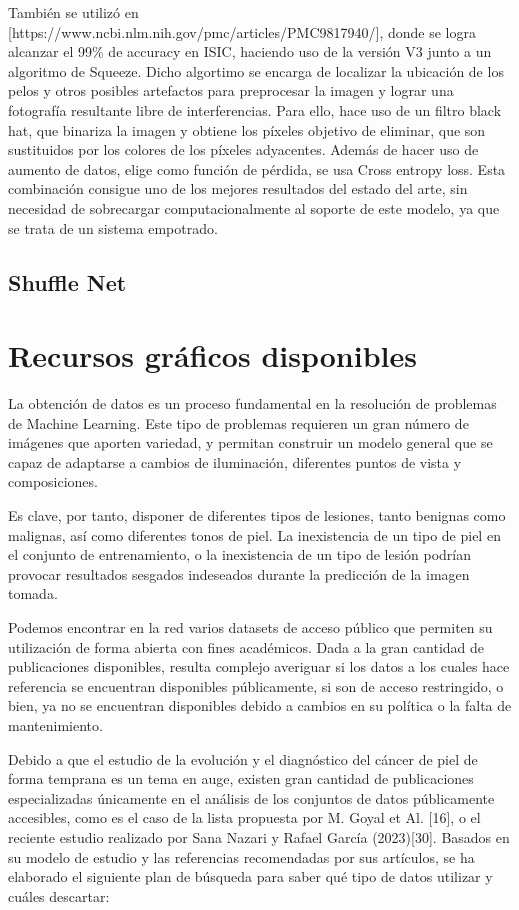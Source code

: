 También se utilizó en [https://www.ncbi.nlm.nih.gov/pmc/articles/PMC9817940/], donde se logra alcanzar el 99\% de accuracy en ISIC, haciendo uso de la versión V3 junto a un algoritmo de Squeeze. Dicho algortimo se encarga de localizar la ubicación de los pelos y otros posibles artefactos para preprocesar la imagen y lograr una fotografía resultante libre de interferencias. Para ello, hace uso de un filtro black hat, que binariza la imagen y obtiene los píxeles objetivo de eliminar, que son sustituidos por los colores de los píxeles adyacentes. Además de hacer uso de aumento de datos, elige como función de pérdida, se usa Cross entropy loss. Esta combinación consigue uno de los mejores resultados del estado del arte, sin necesidad de sobrecargar computacionalmente al soporte de este modelo, ya que se trata de un sistema empotrado.\\ 

\subsection{Shuffle Net}

\section{Recursos gráficos disponibles}

La obtención de datos es un proceso fundamental en la resolución de problemas de Machine Learning. Este tipo de problemas requieren un gran número de imágenes que aporten variedad, y permitan construir un modelo general que se capaz de adaptarse a cambios de iluminación, diferentes puntos de vista y composiciones.

Es clave, por tanto, disponer de diferentes tipos de lesiones, tanto benignas como malignas, así como diferentes tonos de piel. La inexistencia de un tipo de piel en el conjunto de entrenamiento, o la inexistencia de un tipo de lesión podrían provocar resultados sesgados indeseados durante la predicción de la imagen tomada.

Podemos encontrar en la red varios datasets de acceso público que permiten su utilización de forma abierta con fines académicos. Dada a la gran cantidad de publicaciones disponibles, resulta complejo averiguar si los datos a los cuales hace referencia se encuentran disponibles públicamente, si son de acceso restringido, o bien, ya no se encuentran disponibles debido a cambios en su política o la falta de mantenimiento.

Debido a que el estudio de la evolución y el diagnóstico del cáncer de piel de forma temprana es un tema en auge, existen gran cantidad de publicaciones especializadas únicamente en el análisis de los conjuntos de datos públicamente accesibles, como es el caso de la lista propuesta por M. Goyal et Al. [16], o el reciente estudio realizado por Sana Nazari y Rafael García (2023)[30].
Basados en su modelo de estudio y las referencias recomendadas por sus artículos, se ha elaborado el siguiente plan de búsqueda para saber qué tipo de datos utilizar y cuáles descartar:

